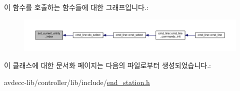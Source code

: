 이 함수를 호출하는 함수들에 대한 그래프입니다.\+:
\nopagebreak
\begin{figure}[H]
\begin{center}
\leavevmode
\includegraphics[width=350pt]{classavdecc__lib_1_1end__station_ac5076f06b60c9882e2f278d6983122b5_icgraph}
\end{center}
\end{figure}




이 클래스에 대한 문서화 페이지는 다음의 파일로부터 생성되었습니다.\+:\begin{DoxyCompactItemize}
\item 
avdecc-\/lib/controller/lib/include/\hyperlink{end__station_8h}{end\+\_\+station.\+h}\end{DoxyCompactItemize}
